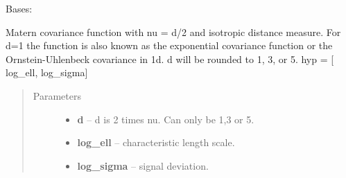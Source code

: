 \documentclass[letterpaper,10pt,english]{sphinxmanual}
\begin{document}
\begin{fulllineitems}
\label{pyGPs.Core:pyGPs.Core.cov.Matern}
Bases: {\hyperref[pyGPs.Core:pyGPs.Core.cov.Kernel]{}}

Matern covariance function with nu = d/2 and isotropic distance measure. 
For d=1 the function is also known as the exponential covariance function 
or the Ornstein-Uhlenbeck covariance in 1d.
d will be rounded to 1, 3, or 5.
hyp = {[} log\_ell, log\_sigma{]}
\begin{quote}\begin{description}
\item[{Parameters}] \leavevmode\begin{itemize}
\item {} 
\textbf{d} -- d is 2 times nu. Can only be 1,3 or 5.

\item {} 
\textbf{log\_ell} -- characteristic length scale.

\item {} 
\textbf{log\_sigma} -- signal deviation.

\end{itemize}

\end{description}\end{quote}

\begin{fulllineitems}
\label{pyGPs.Core:pyGPs.Core.cov.Matern.dfunc}
\end{fulllineitems}


\begin{fulllineitems}
\label{pyGPs.Core:pyGPs.Core.cov.Matern.dmfunc}
\end{fulllineitems}


\begin{fulllineitems}
\label{pyGPs.Core:pyGPs.Core.cov.Matern.func}
\end{fulllineitems}


\end{fulllineitems}
\end{document}
